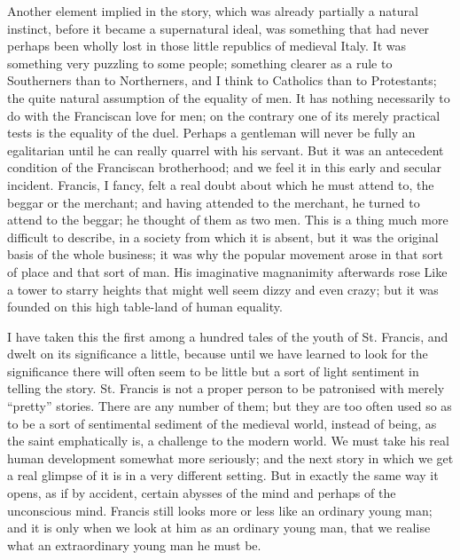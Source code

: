 \documentclass{book}
\begin{document}
Another element implied in the story, which was already partially a natural instinct, before it became a supernatural ideal, was something that had never perhaps been wholly lost in those little republics of medieval Italy. It was something very puzzling to some people; something clearer as a rule to Southerners than to Northerners, and I think to Catholics than to Protestants; the quite natural assumption of the equality of men. It has nothing necessarily to do with the Franciscan love for men; on the contrary one of its merely practical tests is the equality of the duel. Perhaps a gentleman will never be fully an egalitarian until he can really quarrel with his servant. But it was an antecedent condition of the Franciscan brotherhood; and we feel it in this early and secular incident. Francis, I fancy, felt a real doubt about which he must attend to, the beggar or the merchant; and having attended to the merchant, he turned to attend to the beggar; he thought of them as two men. This is a thing much more difficult to describe, in a society from which it is absent, but it was the original basis of the whole business; it was why the popular movement arose in that sort of place and that sort of man. His imaginative magnanimity afterwards rose Like a tower to starry heights that might well seem dizzy and even crazy; but it was founded on this high table-land of human equality.

I have taken this the first among a hundred tales of the youth of St. Francis, and dwelt on its significance a little, because until we have learned to look for the significance there will often seem to be little but a sort of light sentiment in telling the story. St. Francis is not a proper person to be patronised with merely “pretty” stories. There are any number of them; but they are too often used so as to be a sort of sentimental sediment of the medieval world, instead of being, as the saint emphatically is, a challenge to the modern world. We must take his real human development somewhat more seriously; and the next story in which we get a real glimpse of it is in a very different setting. But in exactly the same way it opens, as if by accident, certain abysses of the mind and perhaps of the unconscious mind. Francis still looks more or less like an ordinary young man; and it is only when we look at him as an ordinary young man, that we realise what an extraordinary young man he must be.
\end{document}
